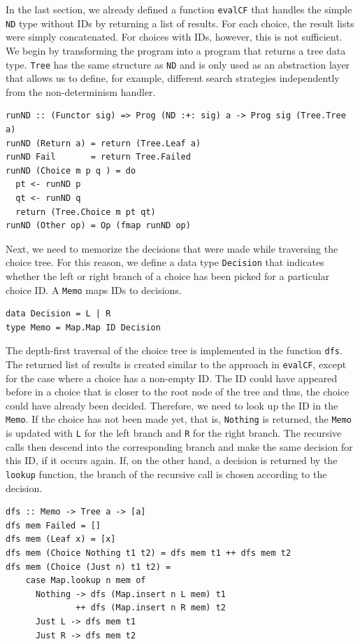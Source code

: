\documentclass[a4paper, 11pt, fleqn, twoside]{scrreprt}
\newcommand{\hinl}[1]{\texttt{#1}}
\begin{document}
In the last section, we already defined a function \hinl{evalCF} that handles the simple \hinl{ND} type without IDs by returning a list of results.
For each choice, the result lists were simply concatenated.
For choices with IDs, however, this is not sufficient.
We begin by transforming the program into a program that returns a tree data type.
\hinl{Tree} has the same structure as \hinl{ND} and is only used as an abstraction layer that allows us to define, for example, different search strategies independently from the non-determinism handler.
 
\begin{verbatim}
runND :: (Functor sig) => Prog (ND :+: sig) a -> Prog sig (Tree.Tree a)
runND (Return a) = return (Tree.Leaf a)
runND Fail       = return Tree.Failed
runND (Choice m p q ) = do
  pt <- runND p
  qt <- runND q
  return (Tree.Choice m pt qt)
runND (Other op) = Op (fmap runND op)
\end{verbatim}

Next, we need to memorize the decisions that were made while traversing the choice tree.
For this reason, we define a data type \hinl{Decision} that indicates whether the left or right branch of a choice has been picked for a particular choice ID.
A \hinl{Memo} maps IDs to decisions.

\begin{verbatim}
data Decision = L | R
type Memo = Map.Map ID Decision
\end{verbatim}

The depth-first traversal of the choice tree is implemented in the function \hinl{dfs}.
The returned list of results is created similar to the approach in \hinl{evalCF}, except for the case where a choice has a non-empty ID.
The ID could have appeared before in a choice that is closer to the root node of the tree and thus, the choice could have already been decided.
Therefore, we need to look up the ID in the \hinl{Memo}.
If the choice has not been made yet, that is, \hinl{Nothing} is returned, the \hinl{Memo} is updated with \hinl{L} for the left branch and \hinl{R} for the right branch.
The recursive calls then descend into the corresponding branch and make the same decision for this ID, if it occurs again.
If, on the other hand, a decision is returned by the \hinl{lookup} function, the branch of the recursive call is chosen according to the decision.

\begin{verbatim}
dfs :: Memo -> Tree a -> [a]
dfs mem Failed = []
dfs mem (Leaf x) = [x]
dfs mem (Choice Nothing t1 t2) = dfs mem t1 ++ dfs mem t2
dfs mem (Choice (Just n) t1 t2) =
    case Map.lookup n mem of
      Nothing -> dfs (Map.insert n L mem) t1 
              ++ dfs (Map.insert n R mem) t2
      Just L -> dfs mem t1
      Just R -> dfs mem t2
\end{verbatim}
\end{document}
